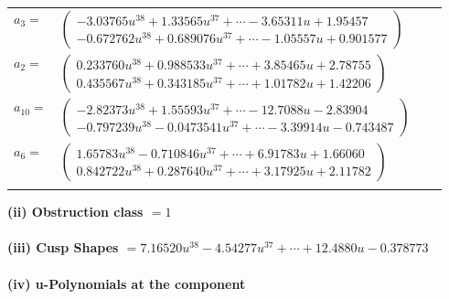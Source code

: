 \documentclass[1p]{elsarticle_modified}
\theoremstyle{definition}
\begin{document}
\begin{tabular}{m{7pt} m{180pt} m{7pt} m{180pt} }
\flushright $a_{3}=$&$\begin{pmatrix}-3.03765 u^{38}+1.33565 u^{37}+\cdots-3.65311 u+1.95457\\-0.672762 u^{38}+0.689076 u^{37}+\cdots-1.05557 u+0.901577\end{pmatrix}$ \\
\flushright $a_{2}=$&$\begin{pmatrix}0.233760 u^{38}+0.988533 u^{37}+\cdots+3.85465 u+2.78755\\0.435567 u^{38}+0.343185 u^{37}+\cdots+1.01782 u+1.42206\end{pmatrix}$ \\
\flushright $a_{10}=$&$\begin{pmatrix}-2.82373 u^{38}+1.55593 u^{37}+\cdots-12.7088 u-2.83904\\-0.797239 u^{38}-0.0473541 u^{37}+\cdots-3.39914 u-0.743487\end{pmatrix}$ \\
\flushright $a_{6}=$&$\begin{pmatrix}1.65783 u^{38}-0.710846 u^{37}+\cdots+6.91783 u+1.66060\\0.842722 u^{38}+0.287640 u^{37}+\cdots+3.17925 u+2.11782\end{pmatrix}$\\&\end{tabular}
\flushleft \textbf{(ii) Obstruction class $= 1$}\\~\\
\flushleft \textbf{(iii) Cusp Shapes $= 7.16520 u^{38}-4.54277 u^{37}+\cdots+12.4880 u-0.378773$}\\~\\
\newpage\renewcommand{\arraystretch}{1}
\flushleft \textbf{(iv) u-Polynomials at the component}\newline \\
\end{document}
